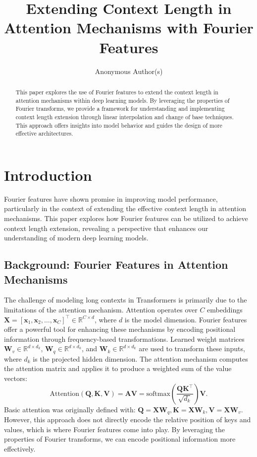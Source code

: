 \documentclass{article}
\title{Extending Context Length in Attention Mechanisms with Fourier Features}
\author{Anonymous Author(s)}
\begin{document}
\maketitle

\begin{abstract}
This paper explores the use of Fourier features to extend the context length in attention mechanisms within deep learning models. By leveraging the properties of Fourier transforms, we provide a framework for understanding and implementing context length extension through linear interpolation and change of base techniques. This approach offers insights into model behavior and guides the design of more effective architectures.
\end{abstract}

\section{Introduction}

Fourier features have shown promise in improving model performance, particularly in the context of extending the effective context length in attention mechanisms. This paper explores how Fourier features can be utilized to achieve context length extension, revealing a perspective that enhances our understanding of modern deep learning models.



\subsection{Background: Fourier Features in Attention Mechanisms}

The challenge of modeling long contexts in Transformers is primarily due to the limitations of the attention mechanism. Attention operates over $C$ embeddings $\mathbf{X} = [\mathbf{x}_1, \mathbf{x}_2, \ldots, \mathbf{x}_C]^\top \in \mathbb{R}^{C \times d}$, where $d$ is the model dimension. Fourier features offer a powerful tool for enhancing these mechanisms by encoding positional information through frequency-based transformations. Learned weight matrices $\mathbf{W}_v \in \mathbb{R}^{d \times d_k}$, $\mathbf{W}_q \in \mathbb{R}^{d \times d_k}$, and $\mathbf{W}_k \in \mathbb{R}^{d \times d_k}$ are used to transform these inputs, where $d_k$ is the projected hidden dimension. The attention mechanism computes the attention matrix and applies it to produce a weighted sum of the value vectors:
\begin{equation}
\text{Attention}(\mathbf{Q}, \mathbf{K}, \mathbf{V}) = \mathbf{A} \mathbf{V} = \text{softmax}\left(\frac{\mathbf{Q} \mathbf{K}^\top}{\sqrt{d_k}}\right)\mathbf{V}.
\end{equation}
Basic attention was originally defined with: $\mathbf{Q} = \mathbf{X} \mathbf{W}_q, \mathbf{K} = \mathbf{X} \mathbf{W}_k, \mathbf{V} = \mathbf{X} \mathbf{W}_v$. However, this approach does not directly encode the relative position of keys and values, which is where Fourier features come into play. By leveraging the properties of Fourier transforms, we can encode positional information more effectively.
\end{document}
